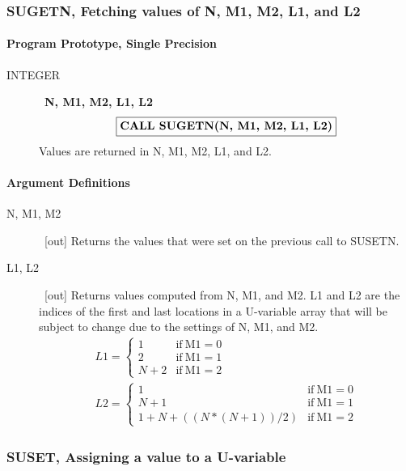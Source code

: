 \documentclass[twoside]{MATH77}
\begin{document}
\subsubsection{SUGETN, Fetching values of N, M1, M2, L1, and L2}

\paragraph{Program Prototype, Single Precision}
\begin{description}
\item[INTEGER]  \ {\bf N, M1, M2, L1, L2}
$$
\fbox{{\bf CALL SUGETN(N, M1, M2, L1, L2)}}
$$
Values are returned in N, M1, M2, L1, and L2.
\end{description}

\paragraph{Argument Definitions}

\begin{description}
\item[N, M1, M2]  \ [out] Returns the values that were set on the
previous call to SUSETN.

\item[L1, L2]  \ [out] Returns values computed from N, M1, and M2.
L1 and L2 are the indices of the first and last locations in a
U-variable array that will be subject to change due to the settings
of N, M1, and M2.\vspace{5pt}
\begin{gather*}
L1 = \begin{cases}
1 & \text{if} ~ \text{M1} = 0 \\
2 & \text{if} ~ \text{M1} = 1 \\
N+2 & \text{if} ~ \text{M1} = 2
\end{cases}\\
L2 = \begin{cases}
1 & \text{if} ~ \text{M1} = 0 \\
N+1 & \text{if} ~ \text{M1} = 1 \\
1+N+((N*(N+1))/2) & \text{if} ~ \text{M1} = 2
\end{cases}
\end{gather*}
\end{description}

\subsubsection{SUSET, Assigning a value to a U-variable}
\end{document}
